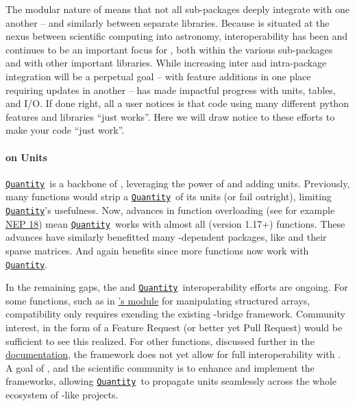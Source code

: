 \documentclass[modern]{aastex631}
\newcommand{\astropyapi}[2]{\href{https://docs.astropy.org/en/stable/api/astropy.#1.html}{#2}}
\newcommand{\astropyapidoc}[2]{\astropyapi{#1}{\texttt{#2}\xspace}}
\newcommand{\astropyQuantity}{\astropyapidoc{units.Quantity}{Quantity}}
\begin{document}

  The modular nature of \astropypkg means that not all sub-packages deeply
  integrate with one another -- and similarly between separate \python
  libraries. Because \astropy is situated at the nexus between scientific
  computing into astronomy, interoperability has been and continues to be an
  important focus for \astropy, both within the various \astropypkg sub-packages
  and with other important \python libraries. While increasing inter and
  intra-package integration will be a perpetual goal -- with feature additions
  in one place requiring updates in another -- \astropy has made impactful
  progress with units, tables, and I/O.
  If done right, all a user notices is that code using many different python
  features and libraries ``just works''. Here we will draw notice to these
  efforts to make your code ``just work''.

  \paragraph{ on Units}

    \astropyQuantity\ is a backbone of \astropy, leveraging the power of
     and adding units. Previously, many  functions
    would strip a \astropyQuantity\ of its units (or fail outright), limiting
    \astropyQuantity's usefulness. Now, advances in  function
    overloading (see for example
    \href{https://numpy.org/neps/nep-0018-array-function-protocol.html}{NEP 18})
    mean \astropyQuantity\ works with almost all  (version 1.17+)
    functions. These advances have similarly benefitted many
    -dependent packages, like  and their sparse
    matrices. And again \astropypkg benefits since more 
    functions now work with \astropyQuantity.

    In the remaining gaps, the  and \astropyQuantity\
    interoperability efforts are ongoing. For some functions, such as in
    \href{https://numpy.org/doc/stable/user/basics.rec.html#module-numpy.lib.recfunctions}{'s
    module} for manipulating structured arrays, compatibility only requires
    exending the existing \package{numpy}-\astropypkg bridge framework.
    Community interest, in the form of a Feature Request (or better yet Pull
    Request) would be sufficient to see this realized. For other functions,
    discussed further in the
    \href{https://docs.astropy.org/en/stable/known_issues.html#known-deficiencies}{\astropy
    documentation}, the \package{numpy} framework does not yet allow for full
    interoperability with \astropy. A goal of \astropy, and the scientific
    \python community is to enhance and implement the frameworks, allowing
    \astropyQuantity\ to propagate units seamlessly across the whole ecosystem of
    \package{numpy}-like projects.
\end{document}
